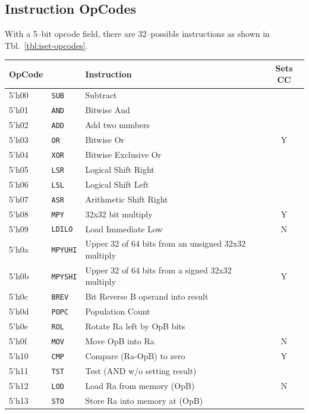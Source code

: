 \documentclass{gqtekspec}
\begin{document}
\subsection{Instruction OpCodes}\label{sec:isa-opcodes}
With a 5--bit opcode field, there are 32--possible instructions as shown in 
Tbl.~\ref{tbl:iset-opcodes}.
\begin{table}\begin{center}
\begin{tabular}{|l|l|l|c|} \hline \rowcolor[gray]{0.85}
OpCode & & Instruction &Sets CC \\\hline\hline
5'h00 & {\tt SUB} & Subtract &   \\\cline{1-3}
5'h01 & {\tt AND} & Bitwise And &   \\\cline{1-3}
5'h02 & {\tt ADD} & Add two numbers &   \\\cline{1-3}
5'h03 & {\tt OR}  & Bitwise Or & Y \\\cline{1-3}
5'h04 & {\tt XOR} & Bitwise Exclusive Or &   \\\cline{1-3}
5'h05 & {\tt LSR} & Logical Shift Right &   \\\cline{1-3}
5'h06 & {\tt LSL} & Logical Shift Left &   \\\cline{1-3}
5'h07 & {\tt ASR} & Arithmetic Shift Right &   \\\hline
5'h08 & {\tt MPY} & 32x32 bit multiply & Y \\\hline
5'h09 & {\tt LDILO} & Load Immediate Low & N\\\hline
5'h0a & {\tt MPYUHI} & Upper 32 of 64 bits from an unsigned 32x32 multiply &  \\\cline{1-3}
5'h0b & {\tt MPYSHI} & Upper 32 of 64 bits from a signed 32x32 multiply & Y \\\cline{1-3}
5'h0c & {\tt BREV} & Bit Reverse B operand into result&  \\\cline{1-3}
5'h0d & {\tt POPC}& Population Count &  \\\cline{1-3}
5'h0e & {\tt ROL} & Rotate Ra left by OpB bits&   \\\hline
5'h0f & {\tt MOV} & Move OpB into Ra & N \\\hline
5'h10 & {\tt CMP} & Compare (Ra-OpB) to zero & Y \\\cline{1-3}
5'h11 & {\tt TST} & Test (AND w/o setting result) &   \\\hline
5'h12 & {\tt LOD} & Load Ra from memory (OpB) & N \\\cline{1-3}
5'h13 & {\tt STO} & Store Ra into memory at (OpB) &  \\\hline\hline

\end{tabular}
\end{center}
\end{table}
\end{document}
